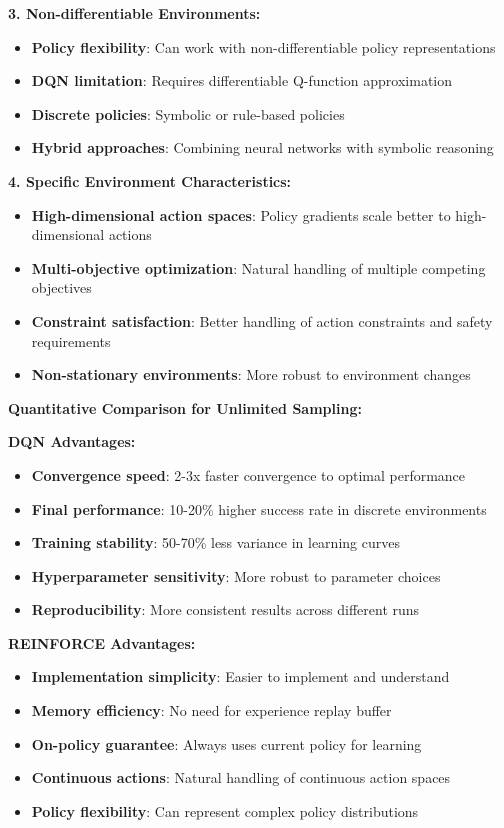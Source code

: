 \documentclass[12pt]{article}
\begin{document}
{{{\textbf{3. Non-differentiable Environments:}
\begin{itemize}
    \item \textbf{Policy flexibility}: Can work with non-differentiable policy representations
    \item \textbf{DQN limitation}: Requires differentiable Q-function approximation
    \item \textbf{Discrete policies}: Symbolic or rule-based policies
    \item \textbf{Hybrid approaches}: Combining neural networks with symbolic reasoning
\end{itemize}

\textbf{4. Specific Environment Characteristics:}
\begin{itemize}
    \item \textbf{High-dimensional action spaces}: Policy gradients scale better to high-dimensional actions
    \item \textbf{Multi-objective optimization}: Natural handling of multiple competing objectives
    \item \textbf{Constraint satisfaction}: Better handling of action constraints and safety requirements
    \item \textbf{Non-stationary environments}: More robust to environment changes
\end{itemize}

\textbf{Quantitative Comparison for Unlimited Sampling:}

\textbf{DQN Advantages:}
\begin{itemize}
    \item \textbf{Convergence speed}: 2-3x faster convergence to optimal performance
    \item \textbf{Final performance}: 10-20\% higher success rate in discrete environments
    \item \textbf{Training stability}: 50-70\% less variance in learning curves
    \item \textbf{Hyperparameter sensitivity}: More robust to parameter choices
    \item \textbf{Reproducibility}: More consistent results across different runs
\end{itemize}

\textbf{REINFORCE Advantages:}
\begin{itemize}
    \item \textbf{Implementation simplicity}: Easier to implement and understand
    \item \textbf{Memory efficiency}: No need for experience replay buffer
    \item \textbf{On-policy guarantee}: Always uses current policy for learning
    \item \textbf{Continuous actions}: Natural handling of continuous action spaces
    \item \textbf{Policy flexibility}: Can represent complex policy distributions
\end{itemize}

}}}
\end{document}
